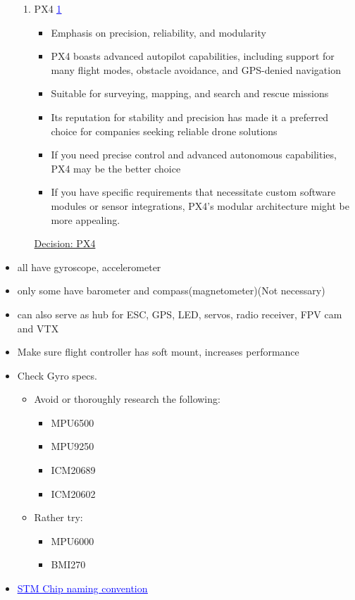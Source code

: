 \begin{itemize}
\begin{enumerate}
				\item PX4 \href{https://www.thedroningcompany.com/blog/px4-vs-ardupilot-choosing-the-right-open-source-flight-stack}{\textcolor{blue}{\underline{1}}}
					\begin{itemize}
						\item Emphasis on precision, reliability, and modularity
						\item PX4 boasts advanced autopilot capabilities, including support for many flight modes, obstacle avoidance, and GPS-denied navigation
						\item Suitable for surveying, mapping, and search and rescue missions
						\item Its reputation for stability and precision has made it a preferred choice for companies seeking reliable drone solutions
						\item If you need precise control and advanced autonomous capabilities, PX4 may be the better choice
						\item If you have specific requirements that necessitate custom software modules or sensor integrations, PX4's modular architecture might be more appealing.
					\end{itemize}
						\underline{Decision: PX4}
			\end{enumerate}
		\item all have gyroscope, accelerometer
		\item only some have barometer and compass(magnetometer)(Not necessary)
		\item can also serve as hub for  ESC, GPS, LED, servos, radio receiver, FPV cam and VTX
		\item Make sure flight controller has soft mount, increases performance
		\item Check Gyro specs. 
			\begin{itemize}
				\item Avoid or thoroughly research the following:
					\begin{itemize}
						\item MPU6500
						\item MPU9250
						\item ICM20689
						\item ICM20602
					\end{itemize}
				\item Rather try:
					\begin{itemize}
						\item MPU6000
						\item BMI270
					\end{itemize}
			\end{itemize}
		\item 
		\href{https://oscarliang.com/f1-f3-f4-flight-controller/}{\textcolor{blue}{\underline{STM Chip naming convention}}}
	\end{itemize}

